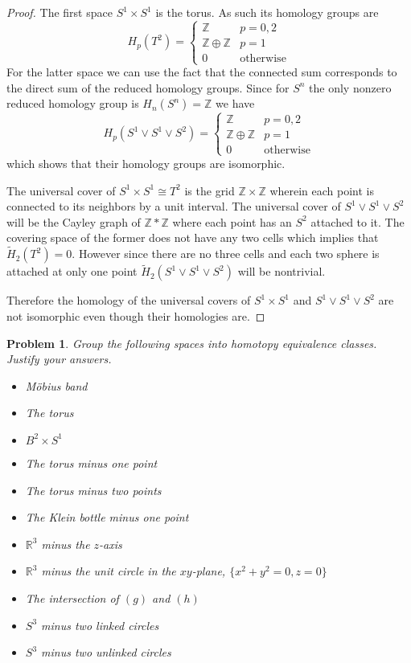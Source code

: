 \documentclass[10pt]{article}
\newcommand{\sk}{\vskip 10mm}
\newcommand{\bb}[1]{\mathbb{#1}}
\theoremstyle{plain}
\newtheorem{problem}{Problem}
\theoremstyle{remark}
\begin{document}
\begin{proof}
  The first space $S^1\times S^1$ is the torus. As such its homology groups are
  \[ H_p(T^2)=
    \left\{
      \begin{array}{lr}
        \bb{Z}& p=0,2\\
        \bb{Z}\oplus\bb{Z}&p=1\\
        0&\mathrm{otherwise}
      \end{array}
    \right.
  \]
  For the latter space we can use the fact that the connected sum corresponds to
  the direct sum of the reduced homology groups. Since for $S^n$ the only nonzero
  reduced homology group is $H_n(S^n)=\bb{Z}$ we have
  \[
    H_p(S^1\vee S^1\vee S^2)=
    \left\{
      \begin{array}{lr}
        \bb{Z}& p=0,2\\
        \bb{Z}\oplus\bb{Z}&p=1\\
        0&\mathrm{otherwise}
      \end{array}
    \right.
  \]
  which shows that their homology groups are isomorphic.

  The universal cover of $S^1\times S^1\cong T^2$ is the grid $\bb{Z}\times\bb{Z}$ wherein
  each point is connected to its neighbors by a unit interval. The universal
  cover of $S^1\vee S^1\vee S^2$ will be the Cayley graph of $\bb{Z}*\bb{Z}$
  where each point has an $S^2$ attached to it. The covering space of the
  former does not have any two cells which implies that $\widetilde{H}_2(T^2)=0$.
  However since there are no three cells and each two sphere is attached at
  only one point $\widetilde{H}_2(S^1\vee S^1\vee S^2)$ will be nontrivial.

  Therefore the homology of the universal covers of $S^1\times S^1$ and $S^1\vee S^1\vee S^2$
  are not isomorphic even though their homologies are.
\end{proof}

\sk

\begin{problem}
  Group the following spaces into homotopy equivalence classes. Justify
  your answers.
  \begin{itemize}
  \item[(a)] M\"obius band
  \item[(b)] The torus
  \item[(c)] $B^2\times S^1$
  \item[(d)] The torus minus one point
  \item[(e)] The torus minus two points
  \item[(f)] The Klein bottle minus one point
  \item[(g)] $\bb{R}^3$ minus the $z$-axis
  \item[(h)] $\bb{R}^3$ minus the unit circle in the $xy$-plane, $\{x^2+y^2=0,z=0\}$
  \item[(i)] The intersection of $(g)$ and $(h)$
  \item[(j)] $S^3$ minus two linked circles
  \item[(k)] $S^3$ minus two unlinked circles
  \end{itemize}
\end{problem}
\end{document}
